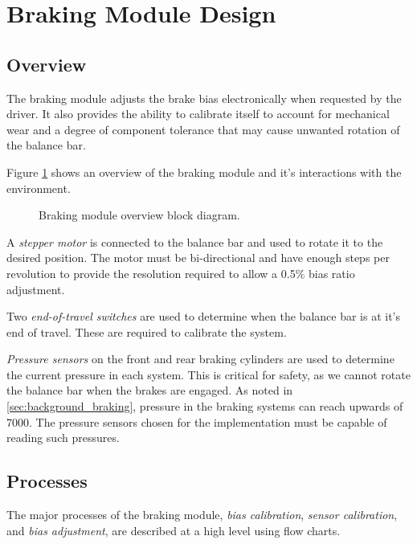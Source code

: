 \section{Braking Module Design\label{sec:Braking-Module-Design}}

\subsection{Overview}

The braking module adjusts the brake bias electronically when requested by the driver. It also provides the ability to calibrate itself to account for mechanical wear and a degree of component tolerance that may cause unwanted rotation of the balance bar. 

Figure \ref{fig:design_brake_overview_block} shows an overview of the braking module and it's interactions with the environment. 

\begin{figure}[H]
\centering

\caption{Braking module overview block diagram.}
\label{fig:design_brake_overview_block}
\end{figure}

A \emph{stepper motor} is connected to the balance bar and used to rotate it to the desired position. The motor must be bi-directional and have enough steps per revolution to provide the resolution required to allow a 0.5\% bias ratio adjustment.

Two \emph{end-of-travel switches} are used to determine when the balance bar is at it's end of travel. These are required to calibrate the system. 

\emph{Pressure sensors} on the front and rear braking cylinders are used to determine the current pressure in each system. This is critical for safety, as we cannot rotate the balance bar when the brakes are engaged. As noted in \ref{sec:background_braking}, pressure in the braking systems can reach upwards of \unit{7000}{\kilo\pascal}. The pressure sensors chosen for the implementation must be capable of reading such pressures.

\subsection{Processes}

The major processes of the braking module, \emph{bias calibration}, \emph{sensor calibration}, and \emph{bias adjustment}, are described at a high level using flow charts.


